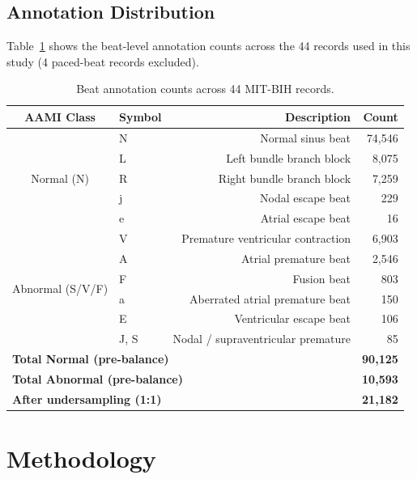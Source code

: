 \documentclass[12pt,a4paper]{article}
\begin{document}
\subsection{Annotation Distribution}

Table~\ref{tab:annotations} shows the beat-level annotation counts across the
44 records used in this study (4 paced-beat records excluded).

\begin{table}[H]
\centering
\caption{Beat annotation counts across 44 MIT-BIH records.}
\label{tab:annotations}
\begin{tabular}{clrr}
    \toprule
    \textbf{AAMI Class} & \textbf{Symbol} & \textbf{Description} & \textbf{Count} \\
    \midrule
    \multirow{5}{*}{Normal (N)}
        & N  & Normal sinus beat         & 74,546 \\
        & L  & Left bundle branch block  & 8,075 \\
        & R  & Right bundle branch block & 7,259 \\
        & j  & Nodal escape beat         & 229 \\
        & e  & Atrial escape beat        & 16 \\
    \midrule
    \multirow{6}{*}{Abnormal (S/V/F)}
        & V  & Premature ventricular contraction & 6,903 \\
        & A  & Atrial premature beat             & 2,546 \\
        & F  & Fusion beat                       & 803 \\
        & a  & Aberrated atrial premature beat   & 150 \\
        & E  & Ventricular escape beat           & 106 \\
        & J, S & Nodal / supraventricular premature & 85 \\
    \midrule
    \multicolumn{3}{l}{\textbf{Total Normal (pre-balance)}}  & \textbf{90,125} \\
    \multicolumn{3}{l}{\textbf{Total Abnormal (pre-balance)}}& \textbf{10,593} \\
    \multicolumn{3}{l}{\textbf{After undersampling (1:1)}}   & \textbf{21,182} \\
    \bottomrule
\end{tabular}
\end{table}

\section{Methodology}
\end{document}
